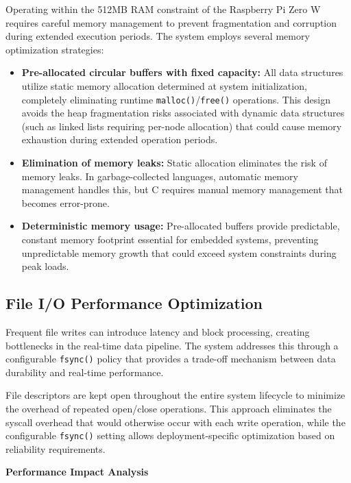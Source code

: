 \documentclass[12pt,a4paper]{article}
\begin{document}
Operating within the 512MB RAM constraint of the Raspberry Pi Zero W requires careful memory management to prevent fragmentation and corruption during extended execution periods. The system employs several memory optimization strategies:

\begin{itemize}

\item \textbf{Pre-allocated circular buffers with fixed capacity:} All data structures utilize static memory allocation determined at system initialization, completely eliminating runtime \texttt{malloc()}/\texttt{free()} operations. This design avoids the heap fragmentation risks associated with dynamic data structures (such as linked lists requiring per-node allocation) that could cause memory exhaustion during extended operation periods.

\item \textbf{Elimination of memory leaks:} Static allocation eliminates the risk of memory leaks. In garbage-collected languages, automatic memory management handles this, but C requires manual memory management that becomes error-prone.

\item \textbf{Deterministic memory usage:} Pre-allocated buffers provide predictable, constant memory footprint essential for embedded systems, preventing unpredictable memory growth that could exceed system constraints during peak loads.
\end{itemize}

\subsection{File I/O Performance Optimization}

Frequent file writes can introduce latency and block processing, creating bottlenecks in the real-time data pipeline. The system addresses this through a configurable \texttt{fsync()} policy that provides a trade-off mechanism between data durability and real-time performance.

File descriptors are kept open throughout the entire system lifecycle to minimize the overhead of repeated open/close operations. This approach eliminates the syscall overhead that would otherwise occur with each write operation, while the configurable \texttt{fsync()} setting allows deployment-specific optimization based on reliability requirements.

\textbf{Performance Impact Analysis}
\end{document}
